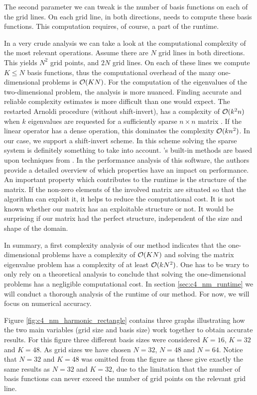 The second parameter we can tweak is the number of basis functions on each of the grid lines. On each grid line, in both directions, \matslise{} needs to compute these basis functions. This computation requires, of course, a part of the runtime.

In a very crude analysis we can take a look at the computational complexity of the most relevant operations. Assume there are $N$ grid lines in both directions. This yields $N^2$ grid points, and $2N$ grid lines. On each of these lines we compute $K \leq N$ basis functions, thus the computational overhead of the many one-dimensional problems is $\operatorname{\mathcal{O}}(K N)$. For the computation of the eigenvalues of the two-dimensional problem, the analysis is more nuanced. Finding accurate and reliable complexity estimates is more difficult than one would expect. The restarted Arnoldi procedure (without shift-invert), has a complexity of $\operatorname{\mathcal{O}}(k^2 n)$ when $k$ eigenvalues are requested for a sufficiently sparse $n \times n$ matrix \cite{lee_k2n_2009}. If the linear operator has a dense operation, this dominates the complexity $\operatorname{\mathcal{O}}(k n^2)$. In our case, we support a shift-invert scheme. In this scheme solving the sparse system is definitely something to take into account. \Eigen{}'s built-in methods are based upon techniques from \superlu{} \cite{demmel_supernodal_1999,li_overview_2005}. In the performance analysis of this software, the authors provide a detailed overview of which properties have an impact on performance. An important property which contributes to the runtime is the structure of the matrix. If the non-zero elements of the involved matrix are situated so that the algorithm can exploit it, it helps to reduce the computational cost. It is not known whether our matrix has an exploitable structure or not. It would be surprising if our matrix had the perfect structure, independent of the size and shape of the domain.

In summary, a first complexity analysis of our method indicates that the one-dimensional problems have a complexity of $\operatorname{\mathcal{O}}(K N)$ and solving the matrix eigenvalue problem has a complexity of at least $\operatorname{\mathcal{O}}(k N^2)$. One has to be wary to only rely on a theoretical analysis to conclude that solving the one-dimensional problems has a negligible computational cost. In section \ref{sec:c4_nm_runtime} we will conduct a thorough analysis of the runtime of our method. For now, we will focus on numerical accuracy.

Figure \ref{fig:c4_nm_harmonic_rectangle} contains three graphs illustrating how the two main variables (grid size and basis size) work together to obtain accurate results. For this figure three different basis sizes were considered $K = 16$, $K = 32$ and $K = 48$. As grid sizes we have chosen $N = 32$, $N = 48$ and $N=64$. Notice that $N = 32$ and $K = 48$ was omitted from the figure as these give exactly the same results as $N = 32$ and $K = 32$, due to the limitation that the number of basis functions can never exceed the number of grid points on the relevant grid line.

